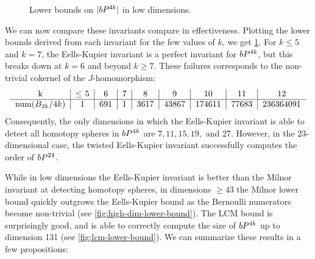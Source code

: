 \begin{figure}[hbt!]
	\centering
{}
\caption{Lower bounds on $|bP^{4k}|$ in low dimensions.}\label{fig:lb-low-dim}
\end{figure}

We can now compare these invariants compare in effectiveness. Plotting the lower bounds derived from each invariant for the few values of $k$, we get \cref{fig:lb-low-dim}. For $k\leq 5$ and $k=7$, the Eells-Kupier invariant is a perfect invariant for $bP^{4k}$, but this breaks down at $k=6$ and beyond $k\geq 7$. These failures corresponds to the non-trivial cokernel of the $J$-homomorphism:
\[
	\begin{tabular}{c|c|c|c|c|c|c|c|c}
		k & $\leq$ 5 & 6 & 7 & 8 & 9 & 10 & 11 & 12\\
		\hline
		$\numer(B_{2k}/4k)$ & 1 & 691 & 1 & 3617 & 43867 & 174611 & 77683 & 236364091\\
	\end{tabular}
\]
Consequently, the only dimensions in which the Eells-Kupier invariant is able to detect all homotopy spheres in $bP^{4k}$ are $7,11,15,19,$ and $27$. However, in the $23$-dimensional case, the twisted Eells-Kupier invariant successfully computes the order of $bP^{24}$. 

While in low dimensions the Eells-Kupier invariant is better than the Milnor invariant at detecting homotopy spheres, in dimensions $\geq 43$ the Milnor lower bound quickly outgrows the Eells-Kupier bound as the Bernoulli numerators become non-trivial (see \cref{fig:high-dim-lower-bound}). The LCM bound is surprisingly good, and is able to correctly compute the size of $bP^{4k}$ up to dimension 131 (see \cref{fig:lcm-lower-bound}).
We can summarize these results in a few propositions:

